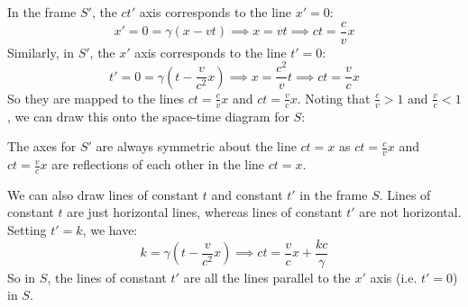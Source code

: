 \documentclass[../main.tex]{subfiles}
\begin{document}
In the frame $S'$, the $ct'$ axis corresponds to the line $x' = 0$:
\[
  x' = 0 = \gamma(x - vt) \implies x = vt \implies ct = \frac{c}{v}x
\]
Similarly, in $S'$, the $x'$ axis corresponds to the line $t' = 0$:
\[
  t' = 0 = \gamma\left(t - \frac{v}{c^2} x\right) \implies x = \frac{c^2}{v}t \implies ct = \frac{v}{c}x
\]
So they are mapped to the lines $ct = \frac{c}{v}x$  and $ct = \frac{v}{c}x$.
Noting that $\frac{c}{v} > 1$ and $\frac{v}{c} < 1$, we can draw this onto the space-time diagram for $S$:
\begin{center}
\end{center}
\begin{remark}[Note]
  The axes for $S'$ are always symmetric about the line $ct = x$ as $ct = \frac{c}{v}x$ and $ct = \frac{v}{c}x$ are reflections of each other in the line $ct = x$.
\end{remark}
We can also draw lines of constant $t$ and constant $t'$ in the frame $S$.
Lines of constant $t$ are just horizontal lines, whereas lines of constant $t'$ are not horizontal.
Setting $t' = k$, we have:
\[
  k = \gamma\left(t - \frac{v}{c^2}x\right) \implies ct = \frac{v}{c}x + \frac{kc}{\gamma}
\]
So in $S$, the lines of constant $t'$ are all the lines parallel to the $x'$ axis (i.e. $t' = 0$) in $S$.
\end{document}
